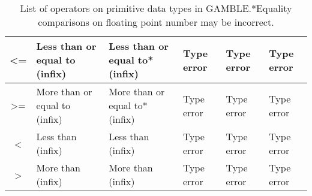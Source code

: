 \begin{table}[h]
\begin{tabular}{|c|l|l|l|l|l|}
    <=                 & Less than or equal to (infix)      & Less than or equal to* (infix)    & Type error            & Type error            & Type error \\ \hline
    >=                 & More than or equal to (infix)      & More than or equal to* (infix)    & Type error            & Type error            & Type error \\ \hline
    <                  & Less than (infix)                  & Less than (infix)                 & Type error            & Type error            & Type error \\ \hline
    >                  & More than (infix)                  & More than (infix)                 & Type error            & Type error            & Type error\\ \hline
    \end{tabular}
    \caption[List of operators on primitive data types in GAMBLE.]{List of operators on primitive data types in GAMBLE.\@*Equality comparisons on floating point number may be incorrect.}\label{tbl:operators}
\end{table}
\vspace{-20pt}